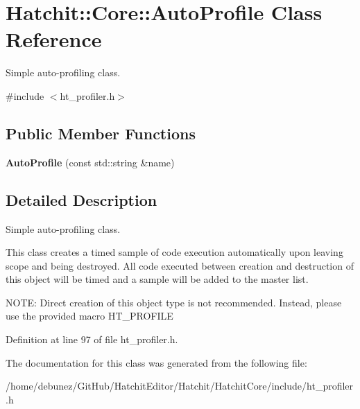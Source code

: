 \hypertarget{classHatchit_1_1Core_1_1AutoProfile}{}\section{Hatchit\+:\+:Core\+:\+:Auto\+Profile Class Reference}
\label{classHatchit_1_1Core_1_1AutoProfile}


Simple auto-\/profiling class.  




{\ttfamily \#include $<$ht\+\_\+profiler.\+h$>$}

\subsection*{Public Member Functions}
\begin{DoxyCompactItemize}
\item 
{\bfseries Auto\+Profile} (const std\+::string \&name)\hypertarget{classHatchit_1_1Core_1_1AutoProfile_a07aba90df5e03e3071398b9de68ab58d}{}\label{classHatchit_1_1Core_1_1AutoProfile_a07aba90df5e03e3071398b9de68ab58d}

\end{DoxyCompactItemize}


\subsection{Detailed Description}
Simple auto-\/profiling class. 

This class creates a timed sample of code execution automatically upon leaving scope and being destroyed. All code executed between creation and destruction of this object will be timed and a sample will be added to the master list.

N\+O\+TE\+: Direct creation of this object type is not recommended. Instead, please use the provided macro H\+T\+\_\+\+P\+R\+O\+F\+I\+LE 

Definition at line 97 of file ht\+\_\+profiler.\+h.



The documentation for this class was generated from the following file\+:\begin{DoxyCompactItemize}
\item 
/home/debunez/\+Git\+Hub/\+Hatchit\+Editor/\+Hatchit/\+Hatchit\+Core/include/ht\+\_\+profiler.\+h\end{DoxyCompactItemize}
